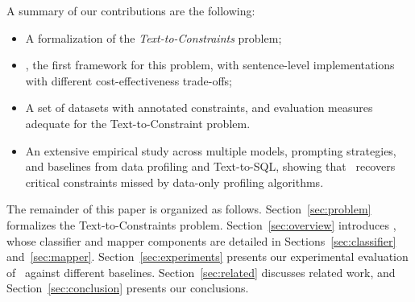 A summary of our contributions are the following:
\begin{itemize}[leftmargin=0.35cm]
\item A formalization of the \emph{Text-to-Constraints} problem;
\item \system, the first framework for this problem, with sentence-level \DIFdelbegin {}\DIFdelend \DIFaddbegin {}\DIFaddend implementations with different cost-effectiveness trade-offs\DIFaddbegin {}\DIFaddend ;
\item A set of datasets with annotated constraints, and evaluation measures adequate for the Text-to-Constraint problem.
\item An extensive empirical study across multiple models, prompting strategies, and baselines from data profiling and Text-to-SQL, showing that \system\ recovers critical constraints missed by data-only profiling algorithms.
\end{itemize}

The remainder of this paper is organized as follows. Section~\ref{sec:problem} formalizes the Text-to-Constraints problem. Section~\ref{sec:overview} introduces \system, whose classifier and mapper components are detailed in Sections~\ref{sec:classifier} and~\ref{sec:mapper}. Section~\ref{sec:experiments} presents our experimental evaluation of \system\ against different baselines. Section~\ref{sec:related} discusses related work, and Section~\ref{sec:conclusion} presents our conclusions.









